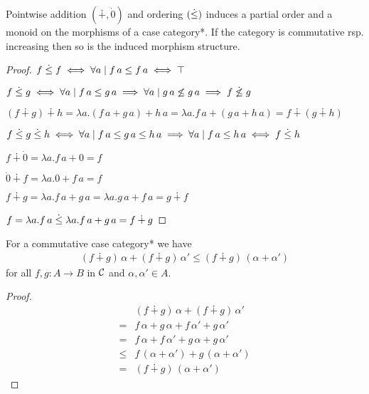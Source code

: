 \documentclass[runningheads,envcountsame]{llncs}
\begin{document}
\begin{lemma}
    Pointwise addition $(\dotplus, \dot 0)$ and ordering $(\mathrel{\dot\leq})$ induces a partial order and a monoid on the morphisms of a case category*. If the category is commutative rsp. increasing then so is the induced morphism structure.
\end{lemma}
\begin{proof}
    $f \mathrel{\dot\leq} f \iff \forall a \mid f\,a \leq f\,a \iff \top$
    
    $f \mathrel{\dot\leq} g \iff \forall a \mid f\,a \leq g\,a \implies \forall a \mid g\,a \not\leq g\,a \implies f \not\mathrel{\dot\leq} g$
    
    $(f \dotplus g) \dotplus h = \lambda a. (f\,a + g\,a) + h\,a = \lambda a. f\,a + (g\,a + h\,a) = f \dotplus (g \dotplus h)$
    
    $f \mathrel{\dot\leq} g \mathrel{\dot\leq} h \iff \forall a \mid f\,a \leq g\,a \leq h\,a \implies \forall a \mid f\,a \leq h\,a \iff f \mathrel{\dot\leq} h$
    
    $f \dotplus \dot 0 = \lambda a. f\,a + 0 = f$
    
    $\dot 0 \dotplus f = \lambda a. 0 + f\,a = f$
    
    $f \dotplus g = \lambda a. f\,a + g\,a = \lambda a. g\,a + f\,a = g \dotplus f$
    
    $f = \lambda a. f\,a \mathrel{\dot\leq} \lambda a. f\,a + g\,a = f \dotplus g$
\end{proof}

\begin{lemma}
    For a commutative case category* we have
    \begin{gather}
        (f \dotplus g)\,\alpha + (f \dotplus g)\,\alpha' \leq (f \dotplus g)\,(\alpha + \alpha')
    \end{gather}
    for all $f, g\colon A \to B$ in $\mathcal{C}$ and $\alpha, \alpha' \in A$.
\end{lemma}
\begin{proof}    
    \begin{align}
             & (f \dotplus g)\,\alpha + (f \dotplus g)\,\alpha' \\
    =        & f\,\alpha + g\,\alpha + f\,\alpha' + g\,\alpha' \\
    =        & f\,\alpha + f\,\alpha' + g\,\alpha + g\,\alpha' \\
    \leq     & f\,(\alpha + \alpha') + g\,(\alpha + \alpha') \\
    =        & (f \dotplus g)\,(\alpha + \alpha')
    \end{align}
\end{proof}
\end{document}
